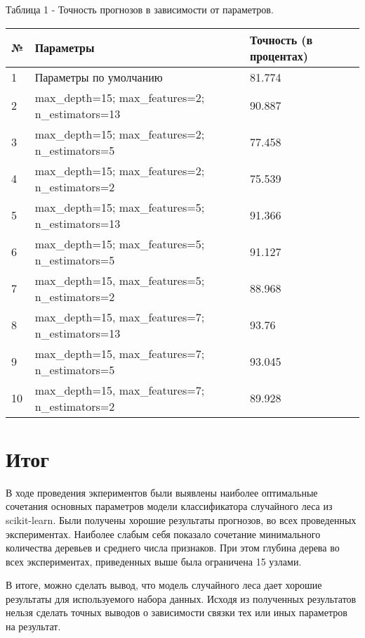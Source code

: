 \documentclass[a4paper,12pt]{article}
\begin{document}
	\vspace{0.5cm}
	Таблица 1 - Точность прогнозов в зависимости от параметров.
\begin{longtable}{|p{1cm}|p{9cm}|p{3cm}|}
\hline
№ & Параметры & Точность (в процентах) \\ 
\hline 
1 & Параметры по умолчанию & 81.774 \\
\hline
2 & max\_depth=15; max\_features=2; n\_estimators=13 & 90.887 \\
\hline 
3 & max\_depth=15; max\_features=2; n\_estimators=5 & 77.458 \\
\hline 
4 & max\_depth=15; max\_features=2; n\_estimators=2 & 75.539 \\
\hline 
5 & max\_depth=15; max\_features=5; n\_estimators=13 & 91.366 \\
\hline
6 & max\_depth=15; max\_features=5; n\_estimators=5 & 91.127 \\
\hline  
7 & max\_depth=15, max\_features=5; n\_estimators=2 & 88.968 \\
\hline
8 & max\_depth=15, max\_features=7; n\_estimators=13 & 93.76\\
\hline 
9 & max\_depth=15, max\_features=7; n\_estimators=5 & 93.045 \\
\hline
10 & max\_depth=15, max\_features=7; n\_estimators=2 & 89.928 \\
\hline
\end{longtable}


\newpage\section{Итог}
	В ходе проведения экпериментов были выявлены наиболее оптимальные сочетания основных параметров модели классификатора случайного леса из scikit-learn. Были получены хорошие результаты прогнозов, во всех проведенных экспериментах. Наиболее слабым себя показало сочетание минимального количества деревьев и среднего числа признаков. При этом глубина дерева во всех экспериментах, приведенных выше была ограничена 15 узлами.
	
	\vspace{0.5cm}
	В итоге, можно сделать вывод, что модель случайного леса дает хорошие результаты для используемого набора данных. Исходя из полученных результатов нельзя сделать точных выводов о зависимости связки тех или иных параметров на результат.
\end{document}
